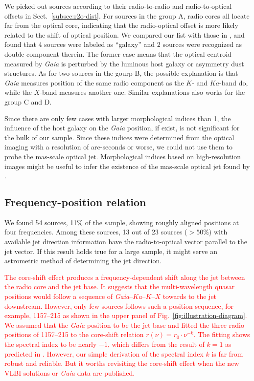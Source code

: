 \documentclass{aa-note}   %
\begin{document}
We picked out sources according to their radio-to-radio and radio-to-optical offsets in Sect.~\ref{subsec:r2o-dist}.
For sources in the group A, radio cores all locate far from the optical core, indicating that the radio-optical offset is more likely related to the shift of optical position.
We compared our list with those in \citet[][their Table~1]{2017ApJ...835L..30M}, and found that 4 sources were labeled as ``galaxy'' and 2 sources were recognized as double component therein.
The former case means that the optical centroid measured by \textit{Gaia} is perturbed by the luminous host galaxy or asymmetry dust structures.
As for two sources in the gourp B, the possible explanation is that \textit{Gaia} measures position of the same radio component as the $K$- and $Ka$-band do, while the $X$-band measures another one.
Similar explanations also works for the group C and D.

Since there are only few cases with larger morphological indices than 1, the influence of the host galaxy on the \textit{Gaia} position, if exist, is not significant for the bulk of our sample.
Since these indices were determined from the optical imaging with a resolution of arc-seconds or worse, we could not use them to probe the mas-scale optical jet.
Morphological indices based on high-resolution images might be useful to infer the existence of the mas-scale optical jet found by \citet{2017MNRAS.467L..71P}.  

\subsection{Frequency-position relation} \label{subsec:freq-pos}
We found 54 sources, 11\% of the sample, showing roughly aligned positions at four frequencies.
Among these sources, 13 out of 23 sources ($>50\%$) with available jet direction information have the radio-to-optical vector parallel to the jet vector.
If this result holds true for a large sample, it might serve an astrometric method of determining the jet direction.

\textcolor{red}{The core-shift effect produces a frequency-dependent shift along the jet between the radio core and the jet base.
It suggests that the multi-wavelength quasar positions would follow a sequence of \textit{Gaia}--$Ka$--$K$--$X$ towards to the jet downstream.
However, only few sources follows such a position sequence, for example, 1157--215 as shown in the upper panel of Fig.~\ref{fig:illustration-diagram}.
We assumed that the \textit{Gaia} position to be the jet base and fitted the three radio positions of 1157--215 to the core-shift relation $r(\nu) = r_0\cdot\nu^{-k}$.
The fitting shows the spectral index to be nearly $-1$, which differs from the result of $k=1$ as predicted in \citet{2009A&A...505L...1P,2008A&A...483..759K}. 
However, our simple derivation of the spectral index $k$ is far from robust and reliable.
But it worths revisiting the core-shift effect when the new VLBI solutions or \textit{Gaia} data are published.}
\end{document}
